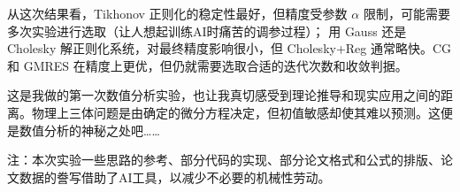 \documentclass[UTF8]{ctexart}
\begin{document}
从这次结果看，Tikhonov 正则化的稳定性最好，但精度受参数 $\alpha$ 限制，可能需要多次实验进行选取（让人想起训练AI时痛苦的调参过程）；
用 Gauss 还是 Cholesky 解正则化系统，对最终精度影响很小，但
Cholesky+Reg 通常略快。CG 和 GMRES 在精度上更优，但仍就需要选取合适的迭代次数和收敛判据。

这是我做的第一次数值分析实验，也让我真切感受到理论推导和现实应用之间的距离。物理上三体问题是由确定的微分方程决定，但初值敏感却使其难以预测。这便是数值分析的神秘之处吧……




注：本次实验一些思路的参考、部分代码的实现、部分论文格式和公式的排版、论文数据的誊写借助了AI工具，以减少不必要的机械性劳动。
\end{document}
